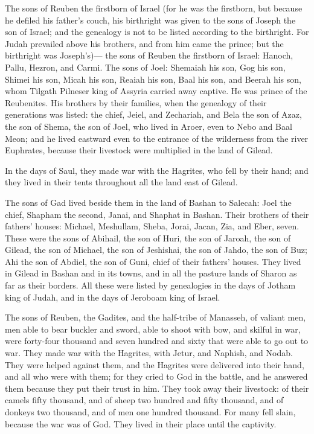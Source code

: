  The sons of Reuben the firstborn of Israel (for he was
the firstborn, but because he defiled his father's couch, his birthright
was given to the sons of Joseph the son of Israel; and the genealogy is
not to be listed according to the birthright.  For Judah
prevailed above his brothers, and from him came the prince; but the
birthright was Joseph's)---  the sons of Reuben the
firstborn of Israel: Hanoch, Pallu, Hezron, and Carmi. 
The sons of Joel: Shemaiah his son, Gog his son, Shimei his son,
 Micah his son, Reaiah his son, Baal his son,
 and Beerah his son, whom Tilgath Pilneser king of Assyria
carried away captive. He was prince of the Reubenites. 
His brothers by their families, when the genealogy of their generations
was listed: the chief, Jeiel, and Zechariah,  and Bela the
son of Azaz, the son of Shema, the son of Joel, who lived in Aroer, even
to Nebo and Baal Meon;  and he lived eastward even to the
entrance of the wilderness from the river Euphrates, because their
livestock were multiplied in the land of Gilead.

 In the days of Saul, they made war with the Hagrites,
who fell by their hand; and they lived in their tents throughout all the
land east of Gilead.

 The sons of Gad lived beside them in the land of Bashan
to Salecah:  Joel the chief, Shapham the second, Janai,
and Shaphat in Bashan.  Their brothers of their fathers'
houses: Michael, Meshullam, Sheba, Jorai, Jacan, Zia, and Eber, seven.
 These were the sons of Abihail, the son of Huri, the son
of Jaroah, the son of Gilead, the son of Michael, the son of Jeshishai,
the son of Jahdo, the son of Buz;  Ahi the son of Abdiel,
the son of Guni, chief of their fathers' houses.  They
lived in Gilead in Bashan and in its towns, and in all the pasture lands
of Sharon as far as their borders.  All these were listed
by genealogies in the days of Jotham king of Judah, and in the days of
Jeroboam king of Israel.

 The sons of Reuben, the Gadites, and the half-tribe of
Manasseh, of valiant men, men able to bear buckler and sword, able to
shoot with bow, and skilful in war, were forty-four thousand and seven
hundred and sixty that were able to go out to war.  They
made war with the Hagrites, with Jetur, and Naphish, and Nodab.
 They were helped against them, and the Hagrites were
delivered into their hand, and all who were with them; for they cried to
God in the battle, and he answered them because they put their trust in
him.  They took away their livestock: of their camels
fifty thousand, and of sheep two hundred and fifty thousand, and of
donkeys two thousand, and of men one hundred thousand. 
For many fell slain, because the war was of God. They lived in their
place until the captivity.

